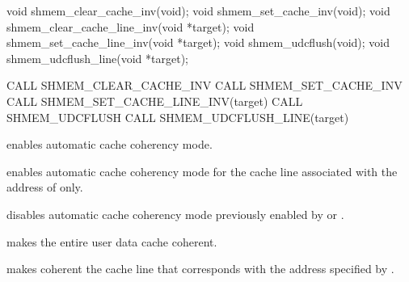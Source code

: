 \synC   %

void shmem_clear_cache_inv(void);
void shmem_set_cache_inv(void);
void shmem_clear_cache_line_inv(void *target);
void shmem_set_cache_line_inv(void *target);
void shmem_udcflush(void);
void shmem_udcflush_line(void *target); %
\synF   %

CALL SHMEM_CLEAR_CACHE_INV
CALL SHMEM_SET_CACHE_INV
CALL SHMEM_SET_CACHE_LINE_INV(target)
CALL SHMEM_UDCFLUSH
CALL SHMEM_UDCFLUSH_LINE(target) %

{   
 enables automatic cache coherency mode.

 enables automatic cache coherency mode for the
cache line associated with the address of  only.

 disables automatic cache coherency mode
previously enabled by  or .

 makes the entire user data cache coherent.

 makes coherent the cache line that corresponds with
the address specified by .
}
{
}
\eAPI 


